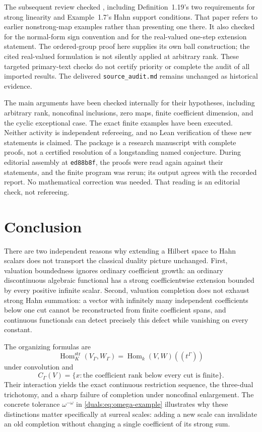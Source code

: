 \documentclass[11pt,letterpaper]{article}
\numberwithin{equation}{section}
\theoremstyle{definition}
\theoremstyle{remark}
\newcommand{\Hom}{\operatorname{Hom}}
\begin{document}
The subsequent review checked \cite[Sections~1.1--1.3]{BKKPS},
including Definition~1.19's two requirements for strong linearity and
Example~1.7's Hahn support conditions. That paper refers to earlier
nonstrong-map examples rather than presenting one there.
It also checked \cite[Sections~2.2 and~2.4]{KKS} for the normal-form
sign convention and \cite[Section~3.1.2, Lemma~2]{Morillon} for the
real-valued one-step extension statement. The ordered-group proof here
supplies its own ball construction; the cited real-valued formulation
is not silently applied at arbitrary rank. These targeted primary-text
checks do not certify priority or complete the audit of all imported
results. The delivered \texttt{source\_audit.md} remains unchanged as
historical evidence.

The main arguments have been checked internally for their hypotheses,
including arbitrary rank, noncofinal inclusions, zero maps, finite
coefficient dimension, and the cyclic exceptional case. The exact
finite examples have been executed. Neither activity is independent
refereeing, and no Lean verification of these new statements is
claimed. The package is a research manuscript with complete proofs,
not a certified resolution of a longstanding named conjecture.
During editorial assembly at \texttt{ed88b8f}, the proofs were read again
against their statements, and the finite program was rerun; its output
agrees with the recorded report. No mathematical correction was needed.
That reading is an editorial check, not refereeing.

\section{Conclusion}
There are two independent reasons why extending a Hilbert space to Hahn
scalars does not transport the classical duality picture unchanged.
First, valuation boundedness ignores ordinary coefficient growth: an
ordinary discontinuous algebraic functional has a strong coefficientwise
extension bounded by every positive infinite scalar. Second, valuation
completion does not exhaust strong Hahn summation: a vector with
infinitely many independent coefficients below one cut cannot be
reconstructed from finite coefficient spans, and continuous functionals
can detect precisely this defect while vanishing on every constant.

The organizing formulas are
\[
 \Hom_K^{\mathrm{str}}(V_\Gamma,W_\Gamma)
 =\Hom_k(V,W)((t^\Gamma))
\]
under convolution and
\[
 C_\Gamma(V)=
 \{x:\text{the coefficient rank below every cut is finite}\}.
\]
Their interaction yields the exact continuous restriction sequence,
the three-dual trichotomy, and a sharp failure of completion under
noncofinal enlargement. The concrete tolerance $\omega^{-\omega}$
in \cref{duals:eq:omega-example} illustrates why these distinctions matter
specifically at surreal scales: adding a new scale can invalidate an
old completion without changing a single coefficient of its strong sum.
\end{document}
